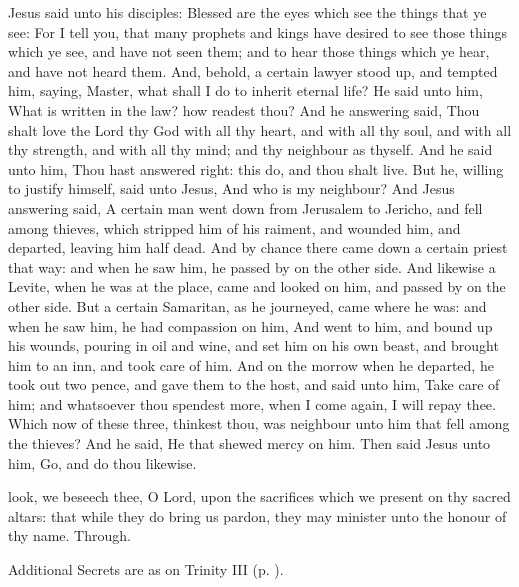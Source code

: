  Jesus said unto his disciples: Blessed are the eyes which see the things that ye see: For I tell you, that many prophets and kings have desired to see those things which ye see, and have not seen them; and to hear those things which ye hear, and have not heard them. And, behold, a certain lawyer stood up, and tempted him, saying, Master, what shall I do to inherit eternal life? He said unto him, What is written in the law? how readest thou? And he answering said, Thou shalt love the Lord thy God with all thy heart, and with all thy soul, and with all thy strength, and with all thy mind; and thy neighbour as thyself. And he said unto him, Thou hast answered right: this do, and thou shalt live. But he, willing to justify himself, said unto Jesus, And who is my neighbour? And Jesus answering said, A certain man went down from Jerusalem to Jericho, and fell among thieves, which stripped him of his raiment, and wounded him, and departed, leaving him half dead. And by chance there came down a certain priest that way: and when he saw him, he passed by on the other side. And likewise a Levite, when he was at the place, came and looked on him, and passed by on the other side. But a certain Samaritan, as he journeyed, came where he was: and when he saw him, he had compassion on him, And went to him, and bound up his wounds, pouring in oil and wine, and set him on his own beast, and brought him to an inn, and took care of him. And on the morrow when he departed, he took out two pence, and gave them to the host, and said unto him, Take care of him; and whatsoever thou spendest more, when I come again, I will repay thee. Which now of these three, thinkest thou, was neighbour unto him that fell among the thieves? And he said, He that shewed mercy on him. Then said Jesus unto him, Go, and do thou likewise.


\secret
{} look, we beseech thee, O Lord, upon the sacrifices which we present on thy sacred altars: that while they do bring us pardon, they may minister unto the honour of thy name. Through.
\begin{rubric}
    Additional Secrets are as on Trinity III (p. \pageref{TrinityIII}).
\end{rubric}


